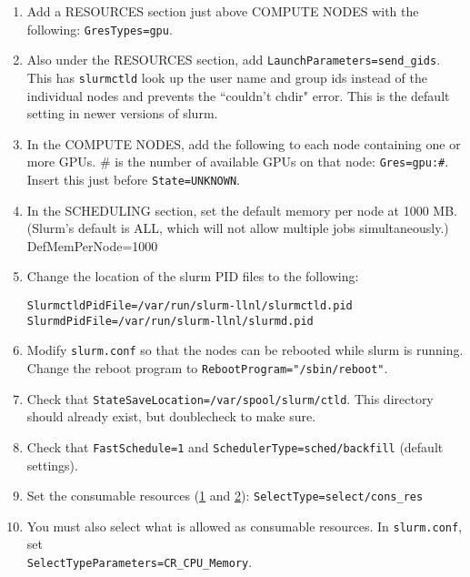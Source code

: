 \begin{enumerate}
\begin{enumerate}
\begin{enumerate}
		\item Add a RESOURCES section just above COMPUTE NODES with the following: \texttt{GresTypes=gpu}.

		\item Also under the RESOURCES section, add \texttt{LaunchParameters=send\_gids}. This has \texttt{slurmctld} look up the user name and group ids instead of the individual nodes and prevents the ``couldn't chdir" error. This is the default setting in newer versions of slurm.

		\item In the COMPUTE NODES, add the following to each node containing one or more GPUs. \# is the number of available GPUs on that node: \texttt{Gres=gpu:\#}. Insert this just before \texttt{State=UNKNOWN}.

		\item In the SCHEDULING section, set the default memory per node at 1000 MB. (Slurm's default is ALL, which will not allow multiple jobs simultaneously.) \\
		DefMemPerNode=1000

		\item Change the location of the slurm PID files to the following:

		\texttt{SlurmctldPidFile=/var/run/slurm-llnl/slurmctld.pid} \\ %
		\texttt{SlurmdPidFile=/var/run/slurm-llnl/slurmd.pid} %

		\item Modify \texttt{slurm.conf} so that the nodes can be rebooted while slurm is running. Change the reboot program to \texttt{RebootProgram="/sbin/reboot"}. 
		
		\item Check that \texttt{StateSaveLocation=/var/spool/slurm/ctld}. This directory should already exist, but doublecheck to make sure.

		\item Check that \texttt{FastSchedule=1} and \texttt{SchedulerType=sched/backfill} (default settings).
	
		\item Set the consumable resources (\href{https://slurm.schedmd.com/cons_res.html}{1} and \href{https://slurm.schedmd.com/cons_res_share.html}{2}):
		\texttt{SelectType=select/cons\_res}
	
		\item You must also select what is allowed as consumable resources. In \texttt{slurm.conf}, set \\
		\texttt{SelectTypeParameters=CR\_CPU\_Memory}. 
	

\end{enumerate}
\end{enumerate}
\end{enumerate}
